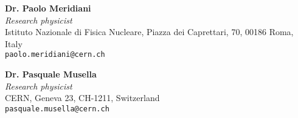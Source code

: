 \documentclass[margin, 10pt]{res} %
\begin{document}
\begin{resume}
\textbf{Dr. Paolo Meridiani} \\
\textit{Research physicist} \\
Istituto Nazionale di Fisica Nucleare, Piazza dei Caprettari, 70, 00186 Roma, Italy \\ 
\texttt{paolo.meridiani@cern.ch} 

\textbf{Dr. Pasquale Musella} \\
\textit{Research physicist} \\
CERN, Geneva 23, CH-1211, Switzerland \\
\texttt{pasquale.musella@cern.ch} 


\end{resume}
\end{document}
